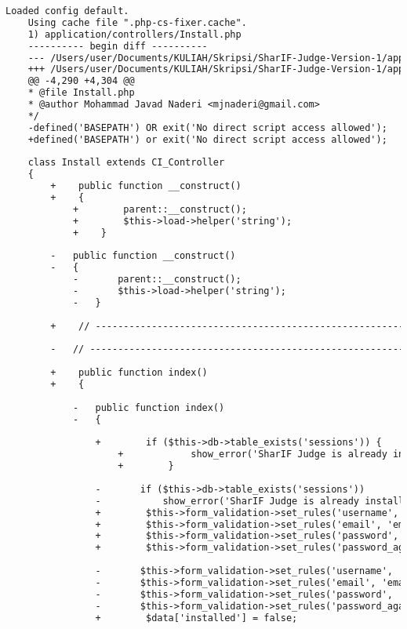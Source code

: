 \begin{lstlisting}[language=diff, caption=Perubahan pada kode Install.php]
	Loaded config default.
	Using cache file ".php-cs-fixer.cache".
	1) application/controllers/Install.php
	---------- begin diff ----------
	--- /Users/user/Documents/KULIAH/Skripsi/SharIF-Judge-Version-1/application/controllers/Install.php
	+++ /Users/user/Documents/KULIAH/Skripsi/SharIF-Judge-Version-1/application/controllers/Install.php
	@@ -4,290 +4,304 @@
	* @file Install.php
	* @author Mohammad Javad Naderi <mjnaderi@gmail.com>
	*/
	-defined('BASEPATH') OR exit('No direct script access allowed');
	+defined('BASEPATH') or exit('No direct script access allowed');
	
	class Install extends CI_Controller
	{
		+    public function __construct()
		+    {
			+        parent::__construct();
			+        $this->load->helper('string');
			+    }
		
		-	public function __construct()
		-	{
			-		parent::__construct();
			-		$this->load->helper('string');
			-	}
		
		+    // ------------------------------------------------------------------------
		
		-	// ------------------------------------------------------------------------
		
		+    public function index()
		+    {
			
			-	public function index()
			-	{
				
				+        if ($this->db->table_exists('sessions')) {
					+            show_error('SharIF Judge is already installed.');
					+        }
				
				-		if ($this->db->table_exists('sessions'))
				-			show_error('SharIF Judge is already installed.');
				+        $this->form_validation->set_rules('username', 'username', 'required|min_length[3]|max_length[20]|alpha_numeric|lowercase');
				+        $this->form_validation->set_rules('email', 'email', 'required|max_length[40]|valid_email|lowercase');
				+        $this->form_validation->set_rules('password', 'password', 'required|min_length[6]|max_length[200]');
				+        $this->form_validation->set_rules('password_again', 'password confirmation', 'required|matches[password]');
				
				-		$this->form_validation->set_rules('username', 'username', 'required|min_length[3]|max_length[20]|alpha_numeric|lowercase');
				-		$this->form_validation->set_rules('email', 'email', 'required|max_length[40]|valid_email|lowercase');
				-		$this->form_validation->set_rules('password', 'password', 'required|min_length[6]|max_length[200]');
				-		$this->form_validation->set_rules('password_again', 'password confirmation', 'required|matches[password]');
				+        $data['installed'] = false;
				

\end{lstlisting}
